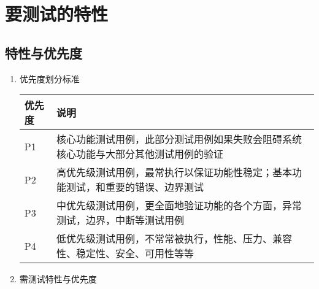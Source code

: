\documentclass[hyperref, a4paper]{ctexart}
\providecommand{\tightlist}{%
  \setlength{\itemsep}{0pt}\setlength{\parskip}{0pt}}
\begin{document}
\hypertarget{ux8981ux6d4bux8bd5ux7684ux7279ux6027}{%
\section{要测试的特性}\label{ux8981ux6d4bux8bd5ux7684ux7279ux6027}}

\hypertarget{ux7279ux6027ux4e0eux4f18ux5148ux5ea6}{%
\subsection{特性与优先度}\label{ux7279ux6027ux4e0eux4f18ux5148ux5ea6}}

\begin{enumerate}
\def\labelenumi{\arabic{enumi}.}
\tightlist
\item
  优先度划分标准

  \begin{tabular}{|p{2cm}|p{8cm}|}
  \hline
  优先度 & 说明\\
  \hline
  P1 & 核心功能测试用例，此部分测试用例如果失败会阻碍系统核心功能与大部分其他测试用例的验证\\
  \hline
  P2 & 高优先级测试用例，最常执行以保证功能性稳定；基本功能测试，和重要的错误、边界测试\\
  \hline
  P3 & 中优先级测试用例，更全面地验证功能的各个方面，异常测试，边界，中断等测试用例\\
  \hline
  P4 & 低优先级测试用例，不常常被执行，性能、压力、兼容性、稳定性、安全、可用性等等\\
  \hline
  \end{tabular}
\item
  需测试特性与优先度


\end{enumerate}
\end{document}
